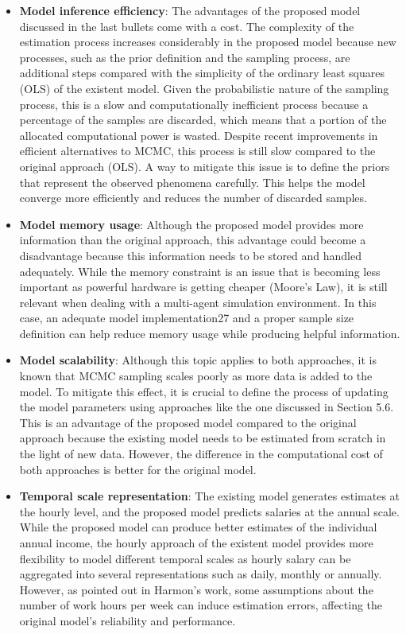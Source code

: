 \begin{itemize}
    \item \textbf{Model inference efficiency}: The advantages of the proposed model discussed in the last bullets come with a cost. The complexity of the estimation process increases considerably in the proposed model because new processes, such as the prior definition and the sampling process, are additional steps compared with the simplicity of the ordinary least squares (OLS) of the existent model. Given the probabilistic nature of the sampling process, this is a slow and computationally inefficient process because a percentage of the samples are discarded, which means that a portion of the allocated computational power is wasted. Despite recent improvements in efficient alternatives to MCMC, this process is still slow compared to the original approach (OLS). A way to mitigate this issue is to define the priors that represent the observed phenomena carefully. This helps the model converge more efficiently and reduces the number of discarded samples. 
    \item \textbf{Model memory usage}: Although the proposed model provides more information than the original approach, this advantage could become a disadvantage because this information needs to be stored and handled adequately. While the memory constraint is an issue that is becoming less important as powerful hardware is getting cheaper (Moore's Law), it is still relevant when dealing with a multi-agent simulation environment. In this case, an adequate model implementation27 and a proper sample size definition can help reduce memory usage while producing helpful information. 

    \item \textbf{Model scalability}: Although this topic applies to both approaches, it is known that MCMC sampling scales poorly as more data is added to the model. To mitigate this effect, it is crucial to define the process of updating the model parameters using approaches like the one discussed in Section 5.6. This is an advantage of the proposed model compared to the original approach because the existing model needs to be estimated from scratch in the light of new data. However, the difference in the computational cost of both approaches is better for the original model. 
    
    \item \textbf{Temporal scale representation}: The existing model generates estimates at the hourly level, and the proposed model predicts salaries at the annual scale. While the proposed model can produce better estimates of the individual annual income, the hourly approach of the existent model provides more flexibility to model different temporal scales as hourly salary can be aggregated into several representations such as daily, monthly or annually. However, as pointed out in Harmon's work, some assumptions about the number of work hours per week can induce estimation errors, affecting the original model's reliability and performance. 
\end{itemize}






 




